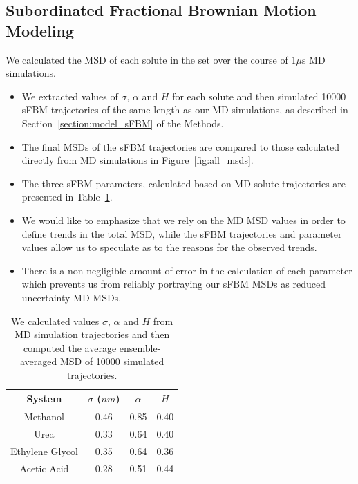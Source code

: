 \documentclass{article}
\begin{document}
  \subsection{Subordinated Fractional Brownian Motion Modeling}\label{section:sFBM}
  
  \noindent We calculated the MSD of each solute in the set over the course of 1$\mu$s MD simulations.  %
  \begin{itemize}
	\item We extracted values of $\sigma$, $\alpha$ and $H$ for each solute
	and then simulated 10000 sFBM trajectories of the same length as our MD
	simulations, as described in Section~\ref{section:model_sFBM} of the Methods.
	\item The final MSDs of the sFBM trajectories are compared to those 
	calculated directly from MD simulations in Figure~\ref{fig:all_msds}. 
	\item The three sFBM parameters, calculated based on MD solute trajectories
	are presented in Table~\ref{table:simulations}.
	\item We would like to emphasize that we rely on the MD MSD values in order to
	define trends in the total MSD, while the sFBM trajectories and parameter 
	values allow us to speculate as to the reasons for the observed trends. 
	\item There is a non-negligible amount of error in the calculation of 
	each parameter which prevents us from reliably portraying our sFBM MSDs as
	reduced	uncertainty MD MSDs.
  \end{itemize}
  
  \begin{table}[h]
  \centering
  \begin{tabular}{cccc}
  \toprule
  System & $\sigma$ ($nm$) & $\alpha$ & $H$ \\
  \midrule
  Methanol & 0.46 & 0.85 & 0.40 \\
  Urea & 0.33 & 0.64 & 0.40 \\
  Ethylene Glycol & 0.35 & 0.64 & 0.36 \\
  Acetic Acid & 0.28 & 0.51 & 0.44 \\
  \bottomrule
  \end{tabular}
  \caption{We calculated values $\sigma$, $\alpha$ and $H$ from MD simulation
  trajectories and then computed the average ensemble-averaged MSD of 10000 
  simulated trajectories.}\label{table:simulations}
  \end{table}
  
\end{document}
